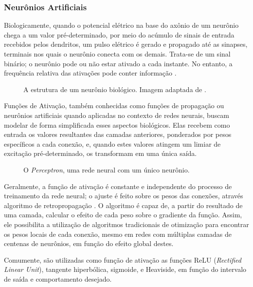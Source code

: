 \subsubsection{Neurônios Artificiais}

Biologicamente, quando o potencial elétrico na base do axônio de um neurônio chega a um valor pré-determinado, por meio do acúmulo de sinais de entrada recebidos pelos dendritos, um pulso elétrico é gerado e propagado até as sinapses, terminais nos quais o neurônio conecta com os demais.
Trata-se de um sinal binário; o neurônio pode ou não estar ativado a cada instante. No entanto, a frequência relativa das ativações pode conter informação \cite{behnkeHierarchicalNeuralNetworks2003}.

\begin{figure}[H]
    \centering
    
    \caption{A estrutura de um neurônio biológico. Imagem adaptada de \cite{dhp1080IdoSkemoPri2016}.}
    \label{fig:bio_neuron}
\end{figure}

Funções de Ativação, também conhecidas como funções de propagação ou neurônios artificiais quando aplicadas no contexto de redes neurais, buscam modelar de forma simplificada esses aspectos biológicos.
Elas recebem como entrada os valores resultantes das camadas anteriores, ponderados por pesos específicos a cada conexão, e, quando estes valores atingem um limiar de excitação pré-determinado, os transformam em uma única saída.

\begin{figure}[H]
    \centering
    
    \caption{O \textit{Perceptron}, uma rede neural com um único neurônio.}
    \label{fig:perceptron}
\end{figure}

Geralmente, a função de ativação é constante e independente do processo de treinamento da rede neural; o ajuste é feito sobre os pesos das conexões, através algoritmo de retropropagação \cite{dreyfusArtificialNeuralNetworks1990}.
O algoritmo é capaz de, a partir do resultado de uma camada, calcular o efeito de cada peso sobre o gradiente da função.
Assim, ele possibilita a utilização de algoritmos tradicionais de otimização para encontrar os pesos locais de cada conexão, mesmo em redes com múltiplas camadas de centenas de neurônios, em função do efeito global destes.

Comumente, são utilizadas como função de ativação as funções ReLU (\textit{Rectified Linear Unit}), tangente hiperbólica, sigmoide, e Heaviside, em função do intervalo de saída e comportamento desejado.

